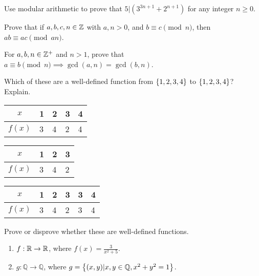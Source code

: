 \documentclass[12pt]{article}
\begin{document}
\begin{qu}
Use modular arithmetic to prove that $5|(3^{3n+1}+2^{n+1})$ for any integer $n\geq 0$.
\end{qu}


\begin{qu}
Prove that if $a, b, c, n \in \mathbb Z$ with $a,n>0$, and $b\equiv c \pmod{n}$, then $ab\equiv ac\pmod{an}$.
\end{qu}

\begin{qu}
For $a, b, n \in \mathbb Z^+$ and $n>1$, prove that $a \equiv b \pmod{n} \implies \gcd(a,n)=\gcd(b,n)$.
\end{qu}

\begin{qu}
Which of these are a well-defined function from $\left\{1,2,3,4\right\}$ to $\left\{1,2,3,4\right\}$? Explain.

\begin{inparaenum}[a)]
\item 
\begin{tabular}{|c|l|l|l|l|}
\hline
$x$ & 1 & 2 & 3 & 4 \\
\hline
$f(x)$ & 3 & 4 & 2 & 4\\
\hline
\end{tabular}
\tab \item 
\begin{tabular}{|c|l|l|l|}
\hline
$x$ & 1 & 2 & 3 \\
\hline
$f(x)$ & 3 & 4 & 2 \\
\hline
\end{tabular}
\tab \item 
\begin{tabular}{|c|l|l|l|l|l|}
\hline
$x$ & 1 & 2 & 3 & 3 & 4 \\
\hline
$f(x)$ & 3 & 4 & 2 & 3& 4\\
\hline
\end{tabular}
\end{inparaenum}
\end{qu}

\begin{qu}
Prove or disprove whether these are well-defined functions. 
\begin{enumerate}[label=\alph*)]
\item $f: \mathbb R \to \mathbb R$, where $f(x)=\frac{3}{x^2+5}$.
\item $g: \mathbb{Q} \to \mathbb{Q}$, where $g=\left\{(x,y)| x,y \in \mathbb{Q}, x^2+y^2=1\right\}$.
\end{enumerate}
\end{qu}
\end{document}
